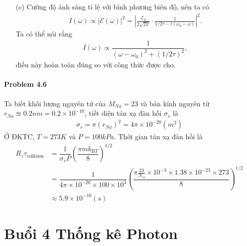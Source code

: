 \documentclass{report}
\newcommand{\f}[2]{\dfrac{#1}{#2}}
\begin{document}
\begin{enumerate}
\begin{align}
		& = \frac{\mathcal{E}_0}{2\sqrt{2\pi}} \left( \frac{1}{1/2\tau - i(\omega_0 - \omega)} + \frac{1}{1/2\tau + i(\omega_0 + \omega)} \right).
	\end{align}
	Giả sử rằng $\omega_0 \gg 1/\tau$,
	\begin{align*}
		\mathcal{E}(\omega) \approx \frac{\mathcal{E}_0}{2\sqrt{2\pi}} \cdot \frac{1}{1/2\tau - i(\omega_0 - \omega)}.
	\end{align*}(ĐPCM)
	\item[(c)]  Cường độ ánh sáng tỉ lệ với bình phương biên độ, nên ta có
	\begin{align}
		I(\omega) \propto |\mathcal{E}(\omega)|^2 = \left|\frac{\mathcal{E}_0}{2\sqrt{2\pi}} \cdot \frac{1}{1/2\tau - i(\omega_0 - \omega)}\right|^2.
	\end{align}
	Ta có thể nói rằng
	\begin{align}
		I(\omega) \propto \f{1}{(\omega - \omega_0)^2 + (1/2\tau)^2},
	\end{align}
	điều này hoàn toàn đúng so với công thức được cho.
\end{enumerate}
\subsubsection*{Problem 4.6}
Ta biết khối lượng nguyên tử của $M_{Na} = 23$ và bán kính nguyên tử $r_{Na} \approxeq 0.2nm = 0.2\times 10^{-10}$, tiết diện tán xạ đàn hồi $\sigma_s$ là
\begin{align}
	\sigma_s = \pi (r_{Na})^2 = 4\pi \times 10^{-20} (m^2)
\end{align}
Ở ĐKTC, $T = 273 K$ và $P = 100k Pa$. Thời gian tán xạ đàn hồi là
\begin{align*}
	R_z
	\tau_{\text{collision}}
	& = \f{1}{\sigma_s P} \left( \f{\pi m k_{\text{B} T}}{8} \right)^{1/2}                                                                                       \\
	& = \f{1}{4\pi \times 10^{-20 } \times 100\times10^{3}} \left( \f{\pi \frac{23}{N_A} \times 10^{-3} \times 1.38\times 10^{-23} \times 273 }{8} \right)^{1/2} \\
	& \approx 5.9 \times 10^{-10} (s)
\end{align*}
\chapter{Buổi 4 Thống kê Photon}
\end{document}

